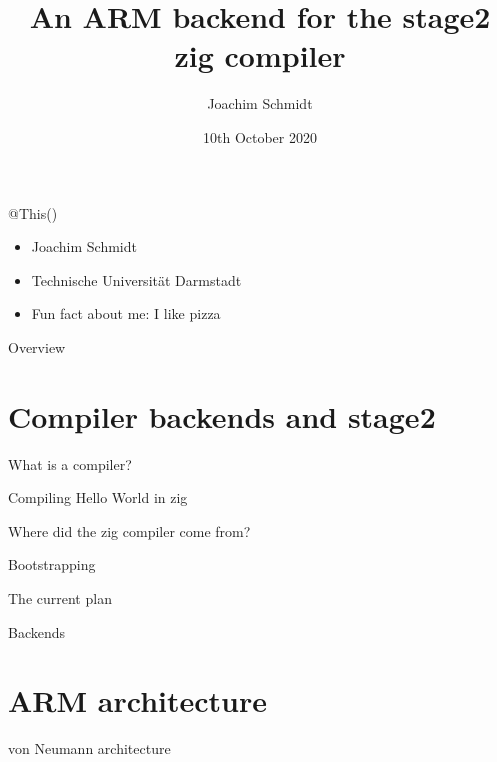 \documentclass{beamer}
\title{An ARM backend for the stage2 zig compiler}
\author{Joachim Schmidt}
\date{10th October 2020}
\begin{document}
\frame{\titlepage}

\begin{frame}{@This()}
    \begin{itemize}
        \item<1-> Joachim Schmidt
        \item<2-> Technische Universität Darmstadt
        \item<3-> Fun fact about me: I like pizza
    \end{itemize}
\end{frame}

\begin{frame}{Overview}
    \tableofcontents
\end{frame}

\section{Compiler backends and stage2}

\begin{frame}{What is a compiler?}
\end{frame}

\begin{frame}{Compiling Hello World in zig}
\end{frame}

\begin{frame}{Where did the zig compiler come from?}
\end{frame}

\begin{frame}{Bootstrapping}
\end{frame}

\begin{frame}{The current plan}
\end{frame}

\begin{frame}{Backends}
\end{frame}

\section{ARM architecture}

\begin{frame}{von Neumann architecture}
\end{frame}
\end{document}

